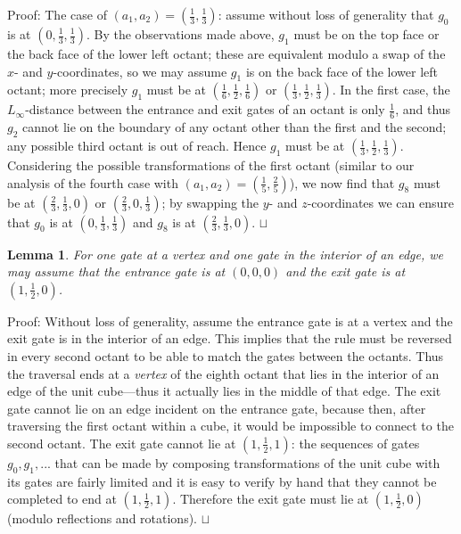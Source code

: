 \documentclass[11pt,a4paper]{article}
\newtheorem{lemma}{Lemma}
\newenvironment{proof}{Proof:}{\qed}
\def\squareforqed{\hbox{\rlap{$\sqcap$}$\sqcup$}}
\def\qed{\ifmmode\squareforqed\else{\unskip\nobreak\hfil
\penalty50\hskip1em\null\nobreak\hfil\squareforqed
\parfillskip=0pt\finalhyphendemerits=0\endgraf}\fi}
\begin{document}
\begin{proof}
The case of $(a_1,a_2) = (\frac13,\frac13)$: assume without loss of generality that $g_0$ is at $(0,\frac13,\frac13)$. By the observations made above, $g_1$ must be on the top face or the back face of the lower left octant; these are equivalent modulo a swap of the $x$- and $y$-coordinates, so we may assume $g_1$ is on the back face of the lower left octant; more precisely $g_1$ must be at $(\frac16,\frac12,\frac16)$ or $(\frac13,\frac12,\frac13)$. In the first case, the $L_\infty$-distance between the entrance and exit gates of an octant is only $\frac16$, and thus $g_2$ cannot lie on the boundary of any octant other than the first and the second; any possible third octant is out of reach. Hence $g_1$ must be at $(\frac13,\frac12,\frac13)$. Considering the possible transformations of the first octant (similar to our analysis of the fourth case with $(a_1,a_2) = (\frac15,\frac25)$), we now find that $g_8$ must be at $(\frac23,\frac13,0)$ or $(\frac23,0,\frac13)$; by swapping the $y$- and $z$-coordinates we can ensure that $g_0$ is at $(0,\frac13,\frac13)$ and $g_8$ is at $(\frac23,\frac13,0)$.
\end{proof}

\begin{lemma}\label{lem:vertex-edge-gates}
For one gate at a vertex and one gate in the interior of an edge, we may assume that the entrance gate is at $(0,0,0)$ and the exit gate is at $(1,\frac12,0)$.
\end{lemma}
\begin{proof}
Without loss of generality, assume the entrance gate is at a vertex and the exit gate is in the interior of an edge. This implies that the rule must be reversed in every second octant to be able to match the gates between the octants. Thus the traversal ends at a \emph{vertex} of the eighth octant that lies in the interior of an edge of the unit cube---thus it actually lies in the middle of that edge. The exit gate cannot lie on an edge incident on the entrance gate, because then, after traversing the first octant within a cube, it would be impossible to connect to the second octant. The exit gate cannot lie at $(1,\frac12,1)$: the sequences of gates $g_0, g_1, ...$ that can be made by composing transformations of the unit cube with its gates are fairly limited and it is easy to verify by hand that they cannot be completed to end at $(1,\frac12,1)$. Therefore the exit gate must lie at $(1,\frac12,0)$ (modulo reflections and rotations).
\end{proof}
\end{document}
